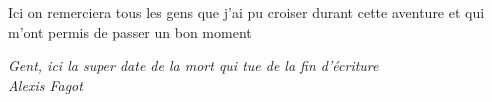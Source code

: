 \documentclass[10pt,a4paper,twoside,dutch,english]{book}                %
\begin{document}
Ici on remerciera tous les gens que j'ai pu croiser durant cette aventure et qui m'ont permis de passer un bon moment

\begin{flushright}{\emph{Gent, ici la super date de la mort qui tue de la fin d'écriture\\
Alexis Fagot}}
\end{flushright}

\clearpage{\pagestyle{empty}\cleardoublepage}


\renewcommand{\contentsname}{Table of Contents} %

\tableofcontents
\clearpage{\pagestyle{empty}\cleardoublepage}

\listoffigures
\clearpage{\pagestyle{empty}\cleardoublepage}

\listoftables
\clearpage{\pagestyle{empty}\cleardoublepage}



\clearpage      %
\thispagestyle{empty}   %
\mbox{}         %
\clearpage{\pagestyle{empty}\cleardoublepage}   %


\renewcommand{\bibname}{References}     %





\mainmatter     %
\renewcommand*{\thesection}{\thechapter.\arabic{section}}

\newcommand\fdtsvrightmarktmp{{\scshape\small Chapter }}
\renewcommand\evenpagerightmark{{\scshape\small\chaptername\ \thechapter}}
\renewcommand\oddpageleftmark{{\scshape\small\leftmark}}
\end{document}
